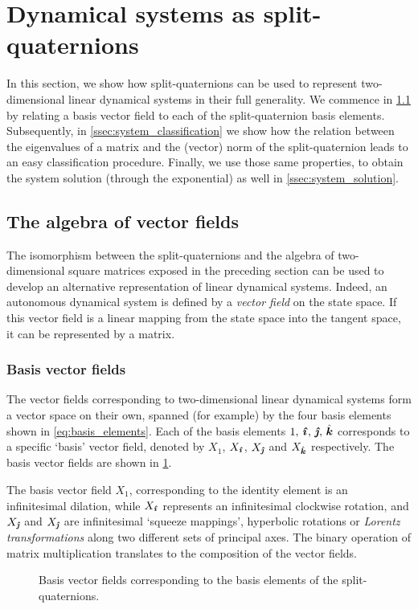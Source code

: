 \section{Dynamical systems as split-quaternions}
\label{sec:system_classification}
In this section, we show how split-quaternions can be used to represent two-dimensional linear dynamical systems in their full generality. We commence in \cref{ssec:vf_algebra} by relating a basis vector field to each of the split-quaternion basis elements. Subsequently, in \cref{ssec:system_classification} we show how the relation between the eigenvalues of a matrix and the (vector) norm of the split-quaternion leads to an easy classification procedure. Finally, we use those same properties, to obtain the system solution (through the exponential) as well in \cref{ssec:system_solution}.

\subsection{The algebra of vector fields}
\label{ssec:vf_algebra}
The isomorphism between the split-quaternions and the algebra of two-dimensional square matrices exposed in the preceding section can be used to develop an alternative representation of linear dynamical systems. Indeed, an autonomous dynamical system is defined by a \emph{vector field} on the state space. If this vector field is a linear mapping from the state space into the tangent space, it can be represented by a matrix. 

\subsubsection{Basis vector fields} The vector fields corresponding to two-dimensional linear dynamical systems form a vector space on their own, spanned (for example) by the four basis elements shown in \cref{eq:basis_elements}. Each of the basis elements \(1,\,\quati,\,\quatj,\,\quatk\) corresponds to a specific `basis' vector field, denoted by \(X_1\), \(X_{\quati}\), \(X_{\quatj}\) and \(X_{\quatk}\) respectively. The basis vector fields are shown in \cref{fig:basis_vf}. 

The basis vector field \(X_1\), corresponding to the identity element is an infinitesimal dilation, while \(X_{\quati}\) represents an infinitesimal clockwise rotation, and \(X_{\quatj}\) and \(X_{\quatj}\) are infinitesimal `squeeze mappings', hyperbolic rotations or \emph{Lorentz transformations} along two different sets of principal axes. The binary operation of matrix multiplication translates to the composition of the vector fields.
\begin{figure}[ht!]
    \centering
    
    \caption{Basis vector fields corresponding to the basis elements of the split-quaternions.}
    \label{fig:basis_vf}
\end{figure}

